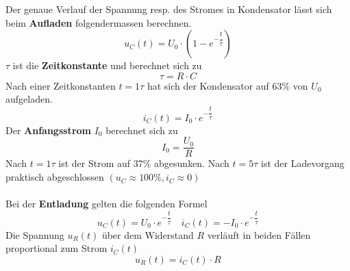 Der genaue Verlauf der Spannung resp. des Stromes in Kondensator lässt sich beim \textbf{Aufladen} folgendermassen berechnen.
\begin{equation}
\boxed{u_C\left(t\right)=U_0\cdot \left(1-e^{-\dfrac{t}{\tau}}\right)}
\end{equation}
$\tau$ ist die \textbf{Zeitkonstante} und berechnet sich zu
\begin{equation}
\boxed{\tau=R\cdot C}
\end{equation}
Nach einer Zeitkonstanten $t=1\tau$ hat sich der Kondensator auf $63\%$ von $U_0$ aufgeladen.
\begin{equation}
\boxed{i_C\left(t\right)=I_0\cdot e^{-\dfrac{t}{\tau}}}
\end{equation}
Der \textbf{Anfangsstrom} $I_0$ berechnet sich zu
\begin{equation}
\boxed{I_0=\dfrac{U_0}{R}}
\end{equation}
Nach $t=1\tau$ ist der Strom auf $37\%$ abgesunken. Nach $t=5\tau$ ist der Ladevorgang praktisch abgeschlossen $(u_C\approx 100\%, i_C\approx 0)$
\\\\
Bei der \textbf{Entladung} gelten die folgenden Formel
\begin{equation}
\boxed{u_C\left(t\right)=U_0\cdot e^{-\dfrac{t}{\tau}}}\quad \boxed{i_C\left(t\right)=-I_0\cdot e^{-\dfrac{t}{\tau}}}
\end{equation}
Die Spannung $u_R\left(t\right)$ über dem Widerstand $R$ verläuft in beiden Fällen proportional zum Strom $i_C\left(t\right)$
\begin{equation}
\boxed{u_R\left(t\right)=i_C\left(t\right)\cdot R}
\end{equation}
